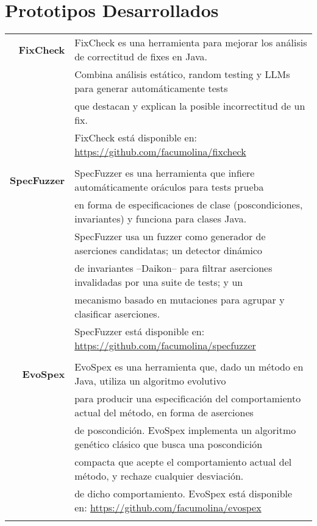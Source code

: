 \documentclass[a4paper,10pt]{article} %
\begin{document}
\section{Prototipos Desarrollados}
\begin{longtable}{rl}

\textbf{FixCheck} & FixCheck es una herramienta para mejorar los análisis de correctitud de fixes en Java. \\
& Combina análisis estático, random testing y LLMs para generar automáticamente tests \\
& que destacan y explican la posible incorrectitud de un fix. \\
& FixCheck está disponible en: \href{https://github.com/facumolina/fixcheck}{https://github.com/facumolina/fixcheck} \\ & \\

\textbf{SpecFuzzer} & SpecFuzzer es una herramienta que infiere automáticamente oráculos para tests prueba \\
& en forma de especificaciones de clase (poscondiciones, invariantes) y funciona para clases Java. \\
& SpecFuzzer usa un fuzzer como generador de aserciones candidatas; un detector dinámico \\
& de invariantes –Daikon– para filtrar aserciones invalidadas por una suite de tests; y un \\
& mecanismo basado en mutaciones para agrupar y clasificar aserciones. \\
& SpecFuzzer está disponible en: \href{https://github.com/facumolina/specfuzzer}{https://github.com/facumolina/specfuzzer} \\ & \\


\textbf{EvoSpex} & EvoSpex es una herramienta que, dado un método en Java, utiliza un algoritmo evolutivo  \\
& para producir una especificación del comportamiento actual del método, en forma de aserciones  \\
& de poscondición. EvoSpex implementa un algoritmo genético clásico que busca una poscondición \\
& compacta que acepte el comportamiento actual del método, y rechaze cualquier desviación. \\
& de dicho comportamiento. EvoSpex está disponible en: \href{https://github.com/facumolina/evospex}{https://github.com/facumolina/evospex} \\ & \\

\end{longtable}
\end{document}
